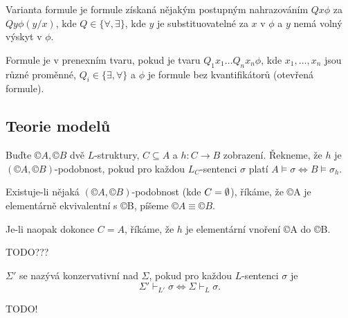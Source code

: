\documentclass[12pt]{article}                   %
\begin{document}
        \begin{definice}
            Varianta formule je formule získaná nějakým postupným nahrazováním $Q x \phi$ za $Q y \phi(y/x)$, kde $Q \in \{\forall, \exists\}$, kde $y$ je substituovatelné za $x$ v $\phi$ a $y$ nemá volný výskyt v $\phi$.

            Formule je v prenexním tvaru, pokud je tvaru $Q_1x_1…Q_nx_n\phi$, kde $x_1, …, x_n$ jsou různé proměnné, $Q_i \in \{\exists, \forall\}$ a $\phi$ je formule bez kvantifikátorů (otevřená formule).
        \end{definice}

    \subsection{Teorie modelů}
        \begin{definice}
            Buďte $©A, ©B$ dvě $L$-struktury, $C \subseteq A$ a $h: C \rightarrow B$ zobrazení. Řekneme, že $h$ je $(©A, ©B)$-podobnost, pokud pro každou $L_C$-sentenci $\sigma$ platí $A \models \sigma \Leftrightarrow B \models \sigma_h$.

            Existuje-li nějaká $(©A, ©B)$-podobnost (kde $C = \emptyset$), říkáme, že ©A je elementárně ekvivalentní s ©B, píšeme $©A ≡ ©B$.

            Je-li naopak dokonce $C = A$, říkáme, že $h$ je elementární vnoření ©A do ©B.
        \end{definice}

        \begin{definice}
            TODO???
        \end{definice}

        \begin{definice}
            $\Sigma'$ se nazývá konzervativní nad $\Sigma$, pokud pro každou $L$-sentenci $\sigma$ je
            $$ \Sigma' \vdash_{L'} \sigma \Leftrightarrow \Sigma \vdash_L \sigma. $$
        \end{definice}

        \begin{definice}
            TODO!
        \end{definice}
\end{document}
